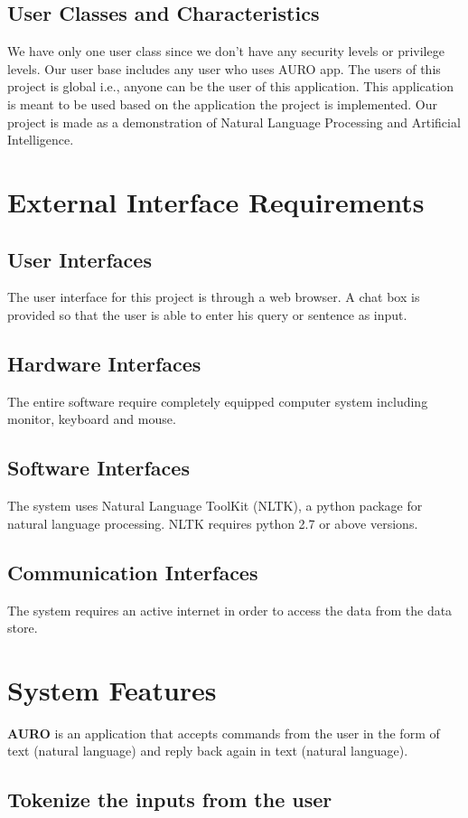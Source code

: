 \subsection*{User Classes and Characteristics}
We have only one user class since we don’t have any security levels or privilege levels.  Our user base includes any user who uses AURO app.  The users of this project is global i.e., anyone can be the user of this application.  This application is meant to be used based on the application the project is implemented.  Our project is made as a demonstration of Natural Language Processing and Artificial Intelligence. 
\section{External Interface Requirements}
\subsection*{User Interfaces}
The user interface for this project is through a web browser.  A chat box is provided so that the user is able to enter his query or sentence as input.
\subsection*{Hardware Interfaces}
The entire software require completely equipped computer system including monitor, keyboard and mouse.
\subsection*{Software Interfaces}
The system uses Natural Language ToolKit (NLTK), a python package for natural language processing.  NLTK requires python 2.7 or above versions. 
\subsection*{Communication Interfaces}
The system requires an active internet in order to access the data from the data store.  
\section{System Features}
\textbf{AURO} is an application that accepts commands from the user in the form of text (natural language) and reply back again in text (natural language).
\subsection*{Tokenize the inputs from the user}

